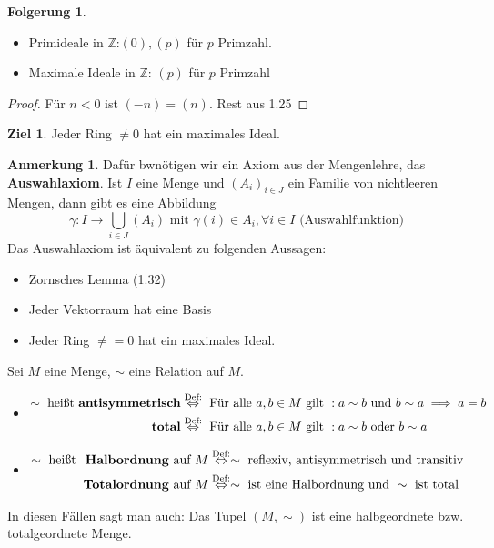 \documentclass[a4paper, titlepage]{article}
\theoremstyle{definition}
\newtheorem*{anm}{Anmerkung}
\newtheorem*{ziel}{Ziel}
\newtheorem*{fg}{Folgerung}
\newcommand{\Z}{\mathbb{Z}}
\begin{document}
\begin{fg}
\begin{itemize}
	\item Primideale in $\Z$:$(0),(p)$ für $p$ Primzahl.
	\item Maximale Ideale in $\Z$: $(p)$ für $p$ Primzahl 
\end{itemize}
\end{fg}
\begin{proof}
	Für $n<0$ ist $(-n)=(n)$. Rest aus 1.25
\end{proof}
\begin{ziel}
 Jeder Ring $\neq 0$ hat ein maximales Ideal.
\end{ziel}
\begin{anm}
    Dafür bwnötigen wir ein Axiom aus der Mengenlehre, das \textbf{Auswahlaxiom}. Ist $I$ eine Menge und $(A_i)_{i\in J}$ ein Familie von nichtleeren Mengen, dann gibt es eine Abbildung $$\gamma: I \longrightarrow \bigcup\limits_{i\in J}(A_i) \text{ mit } \gamma(i)\in A_i, \forall i \in I\text{ (Auswahlfunktion)}$$
    Das Auswahlaxiom ist äquivalent zu folgenden Aussagen:
    \begin{itemize}
        \item Zornsches Lemma (1.32)
        \item Jeder Vektorraum hat eine Basis 
        \item Jeder Ring $\neq = 0$ hat ein maximales Ideal.
    \end{itemize}
\end{anm}
\begin{definition}
    Sei $M$ eine Menge, $\sim$ eine Relation auf $M$.
    \begin{itemize}
        \item \begin{align*} \sim \text{ heißt \textbf{antisymmetrisch}}&\overset{\text{Def:}}\Leftrightarrow \text{ Für alle }a,b\in M\text{ gilt }: a\sim b \text{ und }b\sim a \implies a=b\\
        \text{\textbf{total}}&\overset{\text{Def:}}\Leftrightarrow \text{ Für alle }a,b\in M \text{ gilt }: a \sim b \text{ oder } b\sim a
        \end{align*}
        \item  \begin{align*} \sim \text{ heißt \textbf{ Halbordnung} auf }M&\overset{\text{Def:}}\Leftrightarrow \sim \text{ reflexiv, antisymmetrisch und transitiv}\\
        \text{\textbf{Totalordnung} auf }M&\overset{\text{Def:}}\Leftrightarrow \sim \text{ ist eine Halbordnung und }\sim \text{ ist total}
        \end{align*}
    \end{itemize}
    In diesen Fällen sagt man auch: Das Tupel $(M,\sim)$ ist eine halbgeordnete bzw. totalgeordnete Menge. 
\end{definition}
\end{document}

